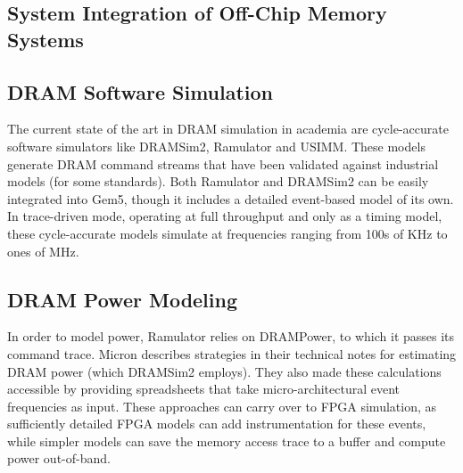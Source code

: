 \subsection{System Integration of Off-Chip Memory Systems}


\subsection{DRAM Software Simulation}

The current state of the art in DRAM simulation in academia are cycle-accurate
software simulators like DRAMSim2\cite{dramsim}, Ramulator\cite{ramulator} and
USIMM\cite{usimm}. These models generate DRAM command streams that have been
validated against industrial models (for some standards). Both Ramulator and
DRAMSim2 can be easily integrated into Gem5\cite{gem5}, though it includes a
detailed event-based model of its own\cite{gem5event}. In trace-driven mode,
operating at full throughput and only as a timing model, these cycle-accurate
models simulate at frequencies ranging from 100s of KHz to ones of
MHz\cite{ramulator}.

\subsection{DRAM Power Modeling}

In order to model power, Ramulator relies on DRAMPower\cite{drampower}, to
which it passes its command trace. Micron describes strategies in their
technical notes for estimating DRAM power\cite{micronpower} (which DRAMSim2
employs). They also made these calculations accessible by providing
spreadsheets that take micro-architectural event frequencies as input. These
approaches can carry over to FPGA simulation, as sufficiently detailed FPGA
models can add instrumentation for these events, while simpler models can save
the memory access trace to a buffer and compute power
out-of-band\cite{strober}.
